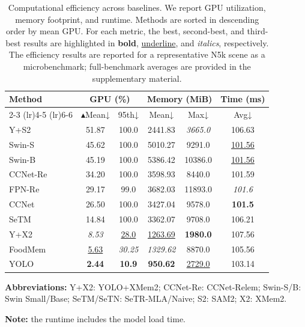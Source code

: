 \documentclass[preprint,12pt]{elsarticle}
\begin{document}
\begin{table}[!htbp]
\centering
\caption{Computational efficiency across baselines.
We report GPU utilization, memory footprint, and runtime.
Methods are sorted in descending order by mean GPU. For each metric, the best, second-best, and third-best results are highlighted in \textbf{bold}, \uline{underline}, and \textit{italics}, respectively. The efficiency results are reported for a representative N5k scene as a microbenchmark; full-benchmark averages are provided in the supplementary material.}
\label{tab:efficiency}
\begin{tabular}{lccccc}
\toprule
\textbf{Method} & 
\multicolumn{2}{c}{\textbf{GPU (\%)}} & 
\multicolumn{2}{c}{\textbf{Memory (MiB)}} &  \textbf{Time (ms)} \\
\cmidrule(lr){2-3} \cmidrule(lr){4-5} \cmidrule(lr){6-6}
 & $\blacktriangle$Mean↓ & 95th↓ & Mean↓ & Max↓ & Avg↓ \\
\midrule
Y+S2 & 51.87 & 100.0 & 2441.83 & \textit{3665.0} & 106.63 \\
\rowcolor{gray!12}
Swin-S & 45.62 & 100.0 & 5010.27 & 9291.0 & \uline{101.56} \\
Swin-B & 45.19 & 100.0 & 5386.42 & 10386.0 & \uline{101.56} \\
\rowcolor{gray!12}
CCNet-Re & 34.20 & 100.0 & 3598.93 & 8440.0 & 101.59 \\
FPN-Re & 29.17 & 99.0 & 3682.03 & 11893.0 & \textit{101.6} \\
\rowcolor{gray!12}
CCNet & 26.50 & 100.0 & 3427.04 & 9578.0 & \textbf{101.5} \\
SeTM & 14.84 & 100.0 & 3362.07 & 9708.0 & 106.21 \\
Y+X2 & \textit{8.53} & \uline{28.0} & \uline{1263.69} & \textbf{1980.0} & 107.56 \\
\rowcolor{gray!12}
FoodMem & \uline{5.63} & \textit{30.25} & \textit{1329.62} & 8870.0 & 105.56 \\
YOLO & \textbf{2.44} & \textbf{10.9} & \textbf{950.62} & \uline{2729.0} & 103.14 \\
\bottomrule
\end{tabular}

\vspace{2pt}
\raggedright
\tiny
\textbf{Abbreviations:}
Y+X2: YOLO+XMem2; CCNet-Re: CCNet-Relem; Swin-S/B: Swin Small/Base; SeTM/SeTN: SeTR-MLA/Naive; S2: SAM2; X2: XMem2.

\textbf{Note:} the runtime includes the model load time. 
\end{table}
\end{document}
